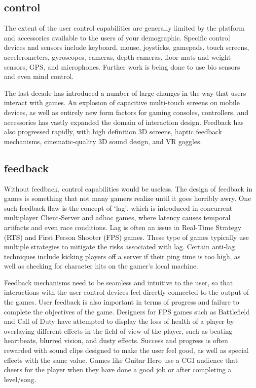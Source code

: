 \subsection{control}

The extent of the user control capabilities are generally limited by the platform and accessories available to the users of your demographic. Specific control devices and sensors include keyboard, mouse, joysticks, gamepads, touch screens, accelerometers, gyroscopes, cameras, depth cameras, floor mats and weight sensors, GPS, and microphones. Further work is being done to use bio sensors and even mind control. 

The last decade has introduced a number of large changes in the way that users interact with games. An explosion of capacitive multi-touch screens on mobile devices, as well as entirely new form factors for gaming consoles, controllers, and accessories has vastly expanded the domain of interaction design. Feedback has also progressed rapidly, with high definition 3D screens, haptic feedback mechanisms, cinematic-quality 3D sound design, and VR goggles.

\subsection{feedback}

Without feedback, control capabilities would be useless. The design of feedback in games is something that not many gamers realize until it goes horribly awry. One such feedback flaw is the concept of ‘lag’, which is introduced in concurrent multiplayer Client-Server and adhoc games, where latency causes temporal artifacts and even race conditions. Lag is often an issue in Real-Time Strategy (RTS) and First Person Shooter (FPS) games. These type of games typically use multiple strategies to mitigate the risks associated with lag. Certain anti-lag techniques include kicking players off a server if their ping time is too high, as well as checking for character hits on the gamer’s local machine.

Feedback mechanisms need to be seamless and intuitive to the user, so that interactions with the user control devices feel directly connected to the output of the games. User feedback is also important in terms of progress and failure to complete the objectives of the game. Designers for FPS games such as Battlefield and Call of Duty have attempted to display the loss of health of a player by overlaying different effects in the field of view of the player, such as beating heartbeats, blurred vision, and dusty effects. Success and progress is often rewarded with sound clips designed to make the user feel good, as well as special effects with the same value. Games like Guitar Hero use a CGI audience that cheers for the player when they have done a good job or after completing a level/song.

